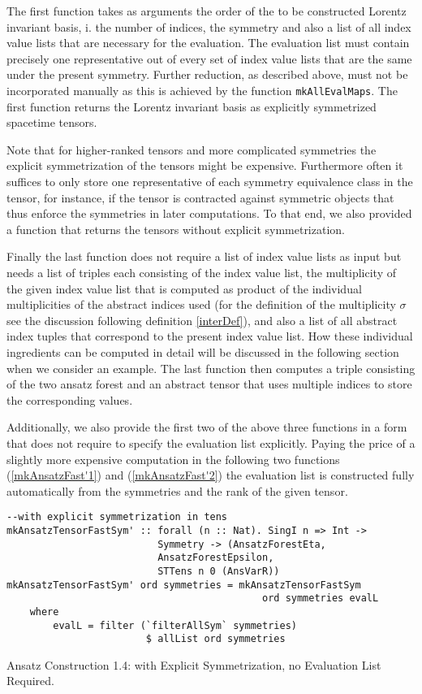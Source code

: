 The first function takes as arguments the order of the to be constructed Lorentz invariant basis, i. the number of indices, the symmetry and also a list of all index value lists that are necessary for the evaluation. The evaluation list must contain precisely one representative out of every set of index value lists that are the same under the present symmetry. Further reduction, as described above, must not be incorporated manually as this is achieved by the function \texttt{mkAllEvalMaps}.
The first function returns the Lorentz invariant basis as explicitly symmetrized spacetime tensors.

Note that for higher-ranked tensors and more complicated symmetries the explicit symmetrization of the tensors might be expensive. Furthermore often it suffices to only store one representative of each symmetry equivalence class in the tensor, for instance, if the tensor is contracted against symmetric objects that thus enforce the symmetries in later computations. To that end, we also provided a function that returns the tensors without explicit symmetrization.

Finally the last function does not require a list of index value lists as input but needs a list of triples each consisting of the index value list, the multiplicity of the given index value list that is computed as product of the individual multiplicities of the abstract indices used (for the definition of the multiplicity $\sigma$ see the discussion following definition \ref{interDef}), and also a list of all abstract index tuples that correspond to the present index value list. How these individual ingredients can be computed in detail will be discussed in the following section when we consider an example. The last function then computes a triple consisting of the two ansatz forest and an abstract tensor that uses multiple indices to store the corresponding values. 

Additionally, we also provide the first two of the above three functions in a form that does not require to specify the evaluation list explicitly. Paying the price of a slightly more expensive computation in the following two functions (\ref{mkAnsatzFast'1}) and (\ref{mkAnsatzFast'2}) the evaluation list is constructed fully automatically from the symmetries and the rank of the given tensor.

\begin{listing}[hbt!]
\begin{verbatim}
--with explicit symmetrization in tens
mkAnsatzTensorFastSym' :: forall (n :: Nat). SingI n => Int ->
                          Symmetry -> (AnsatzForestEta,
                          AnsatzForestEpsilon,
                          STTens n 0 (AnsVarR))
mkAnsatzTensorFastSym' ord symmetries = mkAnsatzTensorFastSym
                                            ord symmetries evalL
    where
        evalL = filter (`filterAllSym` symmetries) 
                        $ allList ord symmetries
\end{verbatim} 
\caption{Ansatz Construction 1.4: with Explicit Symmetrization, no Evaluation List Required.}\label{mkAnsatzFast'1}
\end{listing}

